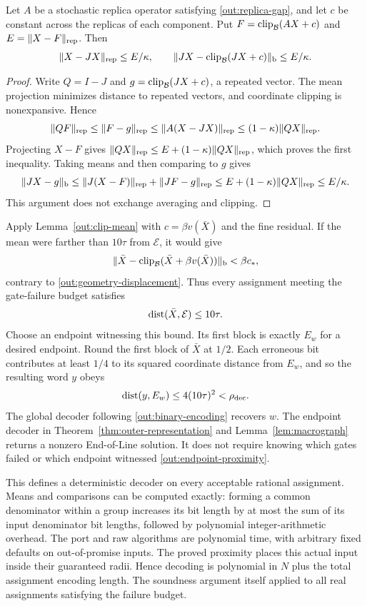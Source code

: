 \begin{lemma}\label{out:clip-mean}
Let $A$ be a stochastic replica operator satisfying
\eqref{out:replica-gap}, and let $c$ be constant across the replicas of
each component. Put $F=\operatorname{clip}_{\mathcal B}(AX+c)$ and
$E=\lVert X-F\rVert_{\rm rep}$. Then
\[
 \lVert X-JX\rVert_{\rm rep}\leq E/\kappa,\qquad
 \lVert JX-\operatorname{clip}_{\mathcal B}(JX+c)\rVert_{\rm b}\leq E/\kappa.
\]
\end{lemma}
\begin{proof}
Write $Q=I-J$ and $g=\operatorname{clip}_{\mathcal B}(JX+c)$, a repeated vector.
The mean projection minimizes distance to repeated vectors, and
coordinate clipping is nonexpansive. Hence
\[
 \lVert QF\rVert_{\rm rep}
 \leq\lVert F-g\rVert_{\rm rep}
 \leq\lVert A(X-JX)\rVert_{\rm rep}
 \leq(1-\kappa)\lVert QX\rVert_{\rm rep}.
\]
Projecting $X-F$ gives
$\lVert QX\rVert_{\rm rep}\leq E+(1-\kappa)\lVert QX\rVert_{\rm rep}$,
which proves the first inequality. Taking means and then comparing to
$g$ gives
\[
 \lVert JX-g\rVert_{\rm b}
 \leq\lVert J(X-F)\rVert_{\rm rep}+\lVert JF-g\rVert_{\rm rep}
 \leq E+(1-\kappa)\lVert QX\rVert_{\rm rep}\leq E/\kappa.
\]
This argument does not exchange averaging and clipping.
\end{proof}

Apply Lemma~\ref{out:clip-mean} with $c=\beta v(\bar X)$ and the fine
residual. If the mean were farther than $10\tau$ from $\mathcal E$, it
would give
\[
 \lVert \bar X-\operatorname{clip}_{\mathcal B}(\bar X+\beta v(\bar X))\rVert_{\rm b}
 <\beta c_* ,
\]
contrary to \eqref{out:geometry-displacement}. Thus every assignment
meeting the gate-failure budget satisfies
\begin{equation}\label{out:endpoint-proximity}
 \operatorname{dist}(\bar X,\mathcal E)\leq10\tau.
\end{equation}
Choose an endpoint witnessing this bound. Its first block is exactly
$E_w$ for a desired endpoint. Round the first block of $\bar X$ at
$1/2$. Each erroneous bit contributes at least $1/4$ to its squared
coordinate distance from $E_w$, and so the resulting word $y$ obeys
\[
 \operatorname{dist}(y,E_w)\leq4(10\tau)^2<\rho_{\rm dec}.
\]
The global decoder following \eqref{out:binary-encoding} recovers $w$.
The endpoint decoder in Theorem~\ref{thm:outer-representation} and
Lemma~\ref{lem:macrograph} returns a nonzero End-of-Line solution. It
does not require knowing which gates failed or which endpoint witnessed
\eqref{out:endpoint-proximity}.

This defines a deterministic decoder on every acceptable rational
assignment. Means and comparisons can be computed exactly: forming a
common denominator within a group increases its bit length by at most
the sum of its input denominator bit lengths, followed by polynomial
integer-arithmetic overhead. The port and raw algorithms are polynomial
time, with arbitrary fixed defaults on out-of-promise inputs. The
proved proximity places this actual input inside their guaranteed
radii. Hence decoding is polynomial in $N$ plus the total assignment
encoding length. The soundness argument itself applied to all real
assignments satisfying the failure budget.

